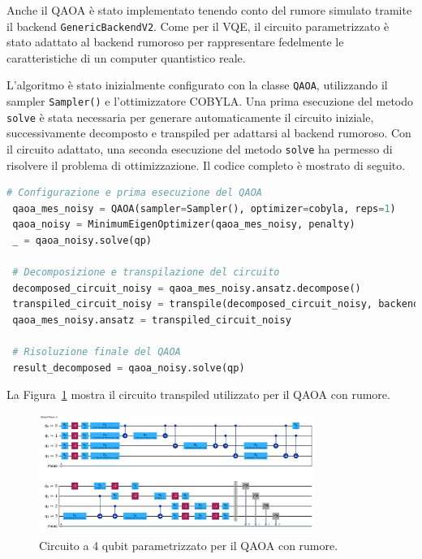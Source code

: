 Anche il QAOA è stato implementato tenendo conto del rumore simulato tramite il backend 
\texttt{GenericBackendV2}. Come per il VQE, il circuito parametrizzato è stato adattato 
al backend rumoroso per rappresentare fedelmente le caratteristiche di un computer 
quantistico reale.

L'algoritmo è stato inizialmente configurato con la classe \texttt{QAOA}, utilizzando 
il sampler \texttt{Sampler()} e l'ottimizzatore COBYLA. Una prima esecuzione del 
metodo \texttt{solve} è stata necessaria per generare automaticamente il circuito 
iniziale, successivamente decomposto e transpiled per adattarsi al backend rumoroso. 
Con il circuito adattato, una seconda esecuzione del metodo \texttt{solve} ha 
permesso di risolvere il problema di ottimizzazione. 
Il codice completo è mostrato di seguito.

\begin{lstlisting}[language=python, caption={Implementazione del QAOA con rumore.}]
 # Configurazione e prima esecuzione del QAOA
 qaoa_mes_noisy = QAOA(sampler=Sampler(), optimizer=cobyla, reps=1)
 qaoa_noisy = MinimumEigenOptimizer(qaoa_mes_noisy, penalty)
 _ = qaoa_noisy.solve(qp)

 # Decomposizione e transpilazione del circuito
 decomposed_circuit_noisy = qaoa_mes_noisy.ansatz.decompose()
 transpiled_circuit_noisy = transpile(decomposed_circuit_noisy, backend=backend)
 qaoa_mes_noisy.ansatz = transpiled_circuit_noisy

 # Risoluzione finale del QAOA
 result_decomposed = qaoa_noisy.solve(qp)
\end{lstlisting}

La Figura~\ref{fig:qaoa_noisy_circuit} mostra il circuito transpiled utilizzato 
per il QAOA con rumore.

\begin{figure}[h!]
    \centering
    \includegraphics[width=0.8\textwidth]{images/circuitoQAOAnoisy.png}
    \caption{Circuito a 4 qubit parametrizzato per il QAOA con rumore.}
    \label{fig:qaoa_noisy_circuit}
\end{figure}





